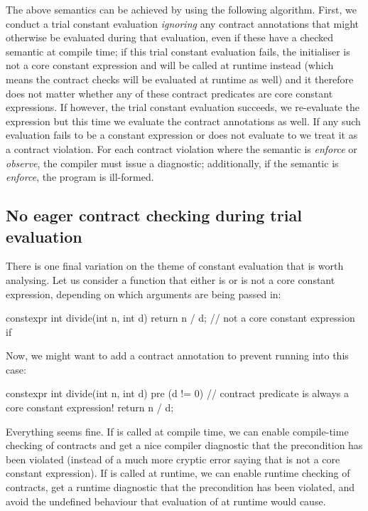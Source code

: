 The above semantics can be achieved by using the following algorithm. First, we conduct a trial constant evaluation \emph{ignoring} any contract annotations that might otherwise be evaluated during that evaluation, even if these have a checked semantic at compile time; if this trial constant evaluation fails, the initialiser is not a core constant expression and will be called at runtime instead (which means the contract checks will be evaluated at runtime as well) and it therefore does not matter whether any of these contract predicates are core constant expressions. If however, the trial constant evaluation succeeds, we re-evaluate the expression but this time we evaluate the contract annotations as well. If any such evaluation fails to be a constant expression or does not evaluate to  we treat it as a contract violation. For each contract violation where the semantic is \emph{enforce} or \emph{observe}, the compiler must issue a diagnostic; additionally, if the semantic is \emph{enforce}, the program is ill-formed.


\subsection{No eager contract checking during trial evaluation}

There is one final variation on the theme of constant evaluation that is worth analysing. Let us consider a  function that either is or is not a core constant expression, depending on which arguments are being passed in:

\begin{codeblock}
constexpr int divide(int n, int d) {
  return n / d;   // not a core constant expression if 
}
\end{codeblock}

Now, we might want to add a contract annotation to prevent running into this case:

\begin{codeblock}
constexpr int divide(int n, int d)
  pre (d != 0) {  // contract predicate is always a core constant expression!
  return n / d; 
}
\end{codeblock}

Everything seems fine. If  is called at compile time, we can enable compile-time checking of contracts and get a nice compiler diagnostic that the precondition has been violated (instead of a much more cryptic error saying that  is not a core constant expression). If  is called at runtime, we can enable runtime checking of contracts, get a runtime diagnostic that the precondition has been violated, and avoid the undefined behaviour that evaluation of  at runtime would cause.


